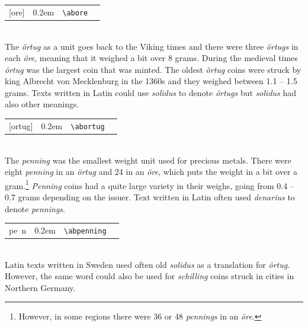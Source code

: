 \documentclass[a4paper]{article}
\newcommand{\samplefont}{\fontsize{16}{16}\abcursivefamily\spaceskip0.2em}
\newcommand{\sample}[1]{{\samplefont #1 \strut}}
\newcommand{\ltxncmd}[1]{\texttt{\textbackslash{}#1}}
\begin{document}
\begin{description}
  \begin{center}
    \begin{tabular}{llll}
      {}[ore]  & \sample{\abore} & \ltxncmd{abore} \\
    \end{tabular}
  \end{center}


\item[\sample{\abortug},
  \emph{Örtug}, \emph{äyrityinen}] \mbox{}\\
  The \emph{örtug} as a unit goes back to the Viking times and there
  were three \emph{örtugs} in each \emph{öre}, meaning that it weighed
  a bit over 8 grams. During the medieval times \emph{örtug} was the
  largest coin that was minted. The oldest \emph{örtug} coins were
  struck by king Albrecht von Mecklenburg in the 1360s and they
  weighed between 1.1 – 1.5 grams. Texts written in Latin could use
  \emph{solidus} to denote \emph{örtugs} but \emph{solidus} had also
  other meanings.

  \begin{center}
    \begin{tabular}{llll}
      {}[ortug]  & \sample{\abortug} & \ltxncmd{abortug} \\
    \end{tabular}
  \end{center}


\item[\sample{\abpenning}
  \emph{Penning}, \emph{penni}] \mbox{}\\
  The \emph{penning} was the smallest weight unit used for precious
  metals. There were eight \emph{penning} in an \emph{örtug} and 24 in
  an \emph{öre}, which puts the weight in a bit over a
  gram.\footnote{However, in some regions there were 36 or 48
    \emph{pennings} in an \emph{öre}.} \emph{Penning} coins had a
  quite large variety in their weighs, going from 0.4 – 0.7 grams
  depending on the issuer. Text written in Latin often used
  \emph{denarius} to denote \emph{pennings}.

  \begin{center}
    \begin{tabular}{llll}
      {}pe~n  & \sample{\abpenning} & \ltxncmd{abpenning} \\
    \end{tabular}
  \end{center}



\item[\sample{\absolidus}
  Solidus ] \mbox{}\\
  Latin texts written in Sweden used often old \emph{solidus} as a
  translation for \emph{örtug}. However, the same word could also be
  used for \emph{schilling} coins struck in cities in Northern
  Germany. 


\end{description}
\end{document}
